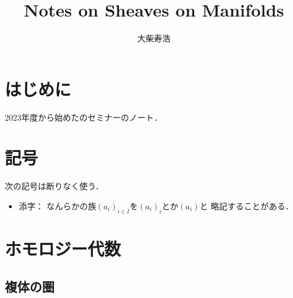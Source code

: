 \theoremstyle{mystyle}
\newtheorem{AXM}{公理}[section]
\newtheorem{DFN}[Axiom]{定義}
\newtheorem{THM}[Axiom]{定理}
\newtheorem*{THM*}{定理}
\newtheorem{PRP}[Axiom]{命題}
\newtheorem{LMM}[Axiom]{補題}
\newtheorem{CRL}[Axiom]{系}
\newtheorem{EG}[Axiom]{例}
\newtheorem{CNV}[Axiom]{規約}




\def\inner<#1>{\langle #1 \rangle}








\title{Notes on Sheaves on Manifolds}
\author{大柴寿浩}
\date{}

\maketitle

\section*{はじめに}
2023年度から始めた\cite{KS90}のセミナーのノート．

\section*{記号}
次の記号は断りなく使う．
\begin{itemize}
    \item 添字：
    なんらかの族$(a_i)_{i\in I}$を$(a_i)_i$とか$(a_i)$と
    略記することがある．
\end{itemize}
\section{ホモロジー代数}
\setcounter{subsection}{2}

\subsection{複体の圏}

